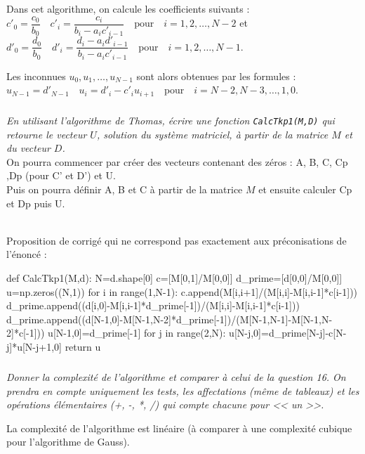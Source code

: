 \documentclass[10pt,fleqn]{article} %
\begin{document}
\begin{multicols}{2}
Dans cet algorithme, on calcule les coefficients suivants : 
$
c'_0 = \dfrac{c_0}{b_0} \quad c'_i = \dfrac{c_i}{b_i - a_i c'_{i-1}}  \quad \text{pour} \quad i=1,2,\ldots, N-2$
et $
d'_0 = \dfrac{d_0}{b_0} \quad d'_i = \dfrac{d_i-a_i d'_{i-1}}{b_i - a_i c'_{i-1}}  \quad \text{pour} \quad i=1,2,\ldots, N-1.
$

Les inconnues $u_0, u_1, \ldots, u_{N-1}$ sont alors obtenues par les formules :
$
u_{N-1} = d'_{N-1} \quad u_i = d'_i -c'_i u_{i+1} \quad  \text{pour} \quad i=N-2, N-3, \ldots, 1, 0.
$

\fi

\subparagraph{}
\textit{En utilisant l'algorithme de Thomas, écrire une fonction \texttt{CalcTkp1(M,D)} 
qui retourne le vecteur $U$, solution du système matriciel, à partir de la matrice 
$M$ et du vecteur $D$.}\\

On pourra commencer par créer  des vecteurs contenant des zéros :
 A, B, C, Cp ,Dp (pour C' et D') et U.\\
 Puis on pourra  définir A, B et C à partir de la matrice $M$ et ensuite calculer Cp et Dp puis U.

\ifprof
\begin{corrige}
~\\
Proposition de corrigé qui ne correspond pas exactement aux préconisations de l'énoncé :

\begin{python}
def CalcTkp1(M,d):
    N=d.shape[0]
    c=[M[0,1]/M[0,0]]
    d_prime=[d[0,0]/M[0,0]]
    u=np.zeros((N,1))
    for i in range(1,N-1):
        c.append(M[i,i+1]/(M[i,i]-M[i,i-1]*c[i-1]))
        d_prime.append((d[i,0]-M[i,i-1]*d_prime[-1])/(M[i,i]-M[i,i-1]*c[i-1]))
    d_prime.append((d[N-1,0]-M[N-1,N-2]*d_prime[-1])/(M[N-1,N-1]-M[N-1,N-2]*c[-1]))
    u[N-1,0]=d_prime[-1]
    for j in range(2,N):
        u[N-j,0]=d_prime[N-j]-c[N-j]*u[N-j+1,0]
    return u
\end{python}
\end{corrige}
\else
\fi

\subparagraph{}
\textit{Donner la complexité de l'algorithme et comparer à celui de la question 16. 
On prendra en compte uniquement les tests, les affectations (même de tableaux)
 et les opérations élémentaires (+, -, *, /) qui compte chacune pour << un >>.}\\

\ifprof
\begin{corrige}
La complexité de l'algorithme est linéaire (à comparer à une complexité cubique pour l'algorithme de Gauss).
\end{corrige}
\else
\fi



\end{multicols}
\end{document}
